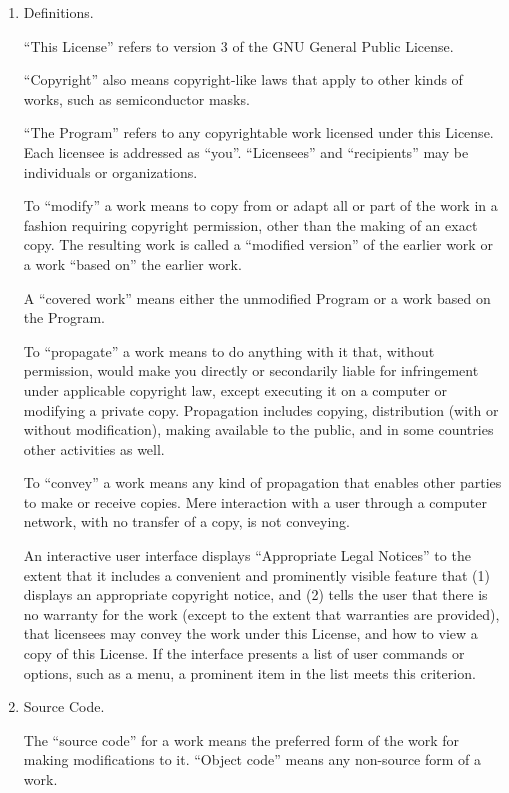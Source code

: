 \documentclass{scrbook}
\begin{document}
\begin{enumerate}

\addtocounter{enumi}{-1}

\item Definitions.

``This License'' refers to version 3 of the GNU General Public License.

``Copyright'' also means copyright-like laws that apply to other kinds of
works, such as semiconductor masks.

``The Program'' refers to any copyrightable work licensed under this
License.  Each licensee is addressed as ``you''.  ``Licensees'' and
``recipients'' may be individuals or organizations.

To ``modify'' a work means to copy from or adapt all or part of the work
in a fashion requiring copyright permission, other than the making of an
exact copy.  The resulting work is called a ``modified version'' of the
earlier work or a work ``based on'' the earlier work.

A ``covered work'' means either the unmodified Program or a work based
on the Program.

To ``propagate'' a work means to do anything with it that, without
permission, would make you directly or secondarily liable for
infringement under applicable copyright law, except executing it on a
computer or modifying a private copy.  Propagation includes copying,
distribution (with or without modification), making available to the
public, and in some countries other activities as well.

To ``convey'' a work means any kind of propagation that enables other
parties to make or receive copies.  Mere interaction with a user through
a computer network, with no transfer of a copy, is not conveying.

An interactive user interface displays ``Appropriate Legal Notices''
to the extent that it includes a convenient and prominently visible
feature that (1) displays an appropriate copyright notice, and (2)
tells the user that there is no warranty for the work (except to the
extent that warranties are provided), that licensees may convey the
work under this License, and how to view a copy of this License.  If
the interface presents a list of user commands or options, such as a
menu, a prominent item in the list meets this criterion.

\item Source Code.

The ``source code'' for a work means the preferred form of the work
for making modifications to it.  ``Object code'' means any non-source
form of a work.


\end{enumerate}
\end{document}
